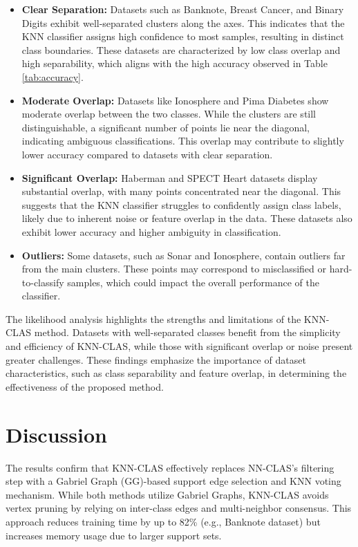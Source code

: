 \documentclass[conference]{IEEEtran}
\begin{document}
\begin{itemize}
    \item \textbf{Clear Separation:} Datasets such as Banknote, Breast Cancer, and Binary Digits exhibit well-separated clusters along the axes. This indicates that the KNN classifier assigns high confidence to most samples, resulting in distinct class boundaries. These datasets are characterized by low class overlap and high separability, which aligns with the high accuracy observed in Table \ref{tab:accuracy}.

    \item \textbf{Moderate Overlap:} Datasets like Ionosphere and Pima Diabetes show moderate overlap between the two classes. While the clusters are still distinguishable, a significant number of points lie near the diagonal, indicating ambiguous classifications. This overlap may contribute to slightly lower accuracy compared to datasets with clear separation.

    \item \textbf{Significant Overlap:} Haberman and SPECT Heart datasets display substantial overlap, with many points concentrated near the diagonal. This suggests that the KNN classifier struggles to confidently assign class labels, likely due to inherent noise or feature overlap in the data. These datasets also exhibit lower accuracy and higher ambiguity in classification.

    \item \textbf{Outliers:} Some datasets, such as Sonar and Ionosphere, contain outliers far from the main clusters. These points may correspond to misclassified or hard-to-classify samples, which could impact the overall performance of the classifier.

\end{itemize}

The likelihood analysis highlights the strengths and limitations of the KNN-CLAS method. Datasets with well-separated classes benefit from the simplicity and efficiency of KNN-CLAS, while those with significant overlap or noise present greater challenges. These findings emphasize the importance of dataset characteristics, such as class separability and feature overlap, in determining the effectiveness of the proposed method.

\section{Discussion}

The results confirm that KNN-CLAS effectively replaces NN-CLAS's filtering step with a Gabriel Graph (GG)-based support edge selection and KNN voting mechanism. While both methods utilize Gabriel Graphs, KNN-CLAS avoids vertex pruning by relying on inter-class edges and multi-neighbor consensus. This approach reduces training time by up to 82\% (e.g., Banknote dataset) but increases memory usage due to larger support sets.
\end{document}
